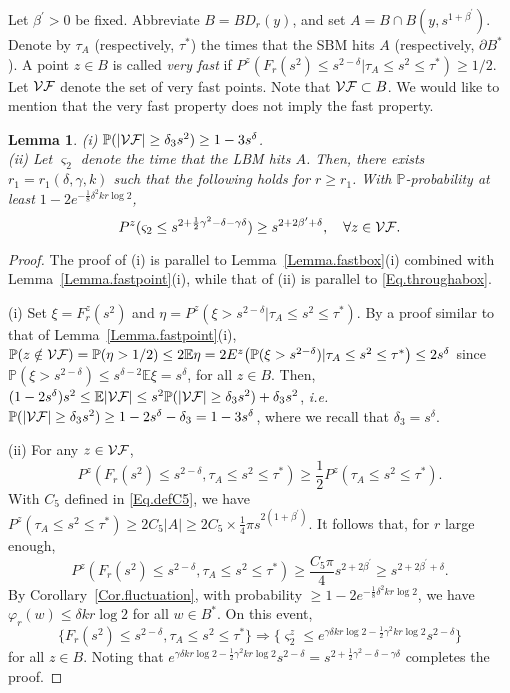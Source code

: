 \documentclass[11pt]{article}
\newtheorem{lemma}[theorem]{Lemma}
\theoremstyle{definition}
\def \b {\beta}
\def \d {\delta}
\def \E {{\mathbb{E}}}
\def \P {{\mathbb{P}}}
\def \vff {{\cal VF}}
\begin{document}
Let $\b^\prime > 0$ be fixed. Abbreviate $B = BD_r (y)$, and set $A = B \cap B(y, s^{1 + \b^\prime} )$.
Denote by $\tau_A$ (respectively, $\tau^*$) the times that the SBM hits
$A$ (respectively,
$\partial B^{*}$). A point $z \in B$ is called {\em very fast}
if $P^z ( F_r(s^2) \le s^{2 - \d} | \tau_A \le s^2 \le \tau^* ) \ge 1 / 2$.
Let $\vff$ denote the set of very fast points. Note that
$\vff \subset B$. We would like to mention that the very fast property does not imply the fast property.

\begin{lemma} \label{Lemma.hitsneary}
(i) $\P ( |\vff| \ge \d_3 s^2 ) \ge 1 - 3 s^\d$.\\
(ii) Let $\varsigma_2$ denote
the time that the LBM hits $A$. Then,
there exists $r_1 = r_1 (\d, \gamma, k)$
such that the following holds for $r \ge r_1$.
With $\P$-probability at least $1 - 2 e^{- \frac 1 8 \d^2 k r \log 2}$,
 \begin{equation} \label{Eq.theta2}
P^z ( \varsigma_2 \le s^{2 + \frac 1 2 \gamma^2 - \d - \gamma \d } ) \ge s^{2 + 2 \b^\prime + \d }, \ \ \ \forall z \in \vff .
 \end{equation}
 \end{lemma}
 \begin{proof}
The proof of (i) is parallel to Lemma~\ref{Lemma.fastbox}(i) combined with Lemma~\ref{Lemma.fastpoint}(i), while that of (ii) is parallel to \eqref{Eq.throughabox}.

(i) Set $\xi = F_r^z (s^2) $ and
$\eta = P^z ( \xi > s^{2-\d} | \tau_A \le s^2 \le \tau^* )$.
By a proof similar to that of  Lemma~\ref{Lemma.fastpoint}(i),
$\P (z \notin \vff ) = \P (\eta > 1/2)  \le 2 \E \eta = 2 E^z \big( \P(\xi > s^{2-\d}) | \tau_A \le s^2 \le \tau^* \big) \le 2 s^\d$ since $\P (\xi > s^{2 - \d }) \le s^{\d -2} \E \xi = s^\d$, for all $z \in B$.
Then, $(1 - 2 s^{\d} ) s^2 \le \E |\vff| \le s^2 \P (|\vff| \ge \d_3 s^2)+ \d_3 s^2$, {\em i.e.} $ \P (|\vff| \ge \d_3 s^2) \ge 1 - 2 s^\d - \d_3 = 1 - 3 s^\d$, where we recall that $\d_3 = s^\d$. 

(ii) For any $z \in \vff$,
 $$
P^z (F_r (s^2) \le s^{2-\d},
\tau_A \le s^2 \le \tau^*  ) \ge \frac 1 2 P^z ( \tau_A \le s^2 \le \tau^*  ).
 $$
With $C_5$ defined in \eqref{Eq.defC5}, we have $P^z ( \tau_A \le s^2 \le \tau^*  )  \ge 2 C_5 |A| \ge 2 C_5 \times \frac 1 4 \pi  s^{2(1 + \b^\prime)}$. It follows that, for $r$ large enough,
$$  P^z (F_r (s^2) \le s^{2 - \d}, \tau_A \le s^2 \le \tau^*  ) \ge
\frac {C_5 \pi}{4} s^{2 + 2 \b^\prime} \ge s^{2 + 2 \b^\prime + \d}.$$
By Corollary~\ref{Cor.fluctuation}, with probability $\ge 1 - 2 e^{- \frac 1 8 \d^2 k r \log 2}$, we have $\varphi_r (w) \le \d k r \log 2$ for all $w \in B^*$. On this event,
 $$
\{ F_r (s^2) \le s^{2-\d}, \tau_A \le s^2 \le \tau^* \}
\Rightarrow \{\varsigma_2^z \le e^{\gamma \d k r \log 2 - \frac 1 2 \gamma^2 k r \log 2} s^{2 - \d}\}
 $$
for all $z \in B$. Noting that
$e^{\gamma \d k r \log 2 - \frac 1 2 \gamma^2 k r \log 2} s^{2 - \d}= s^{2 + \frac 1 2 \gamma^2- \d - \gamma \d}$ completes the proof.
 \end{proof}
\end{document}
